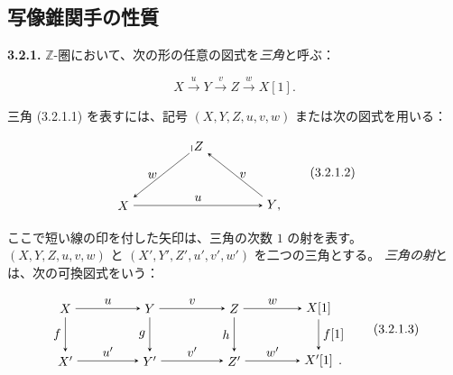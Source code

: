 \clearpage
{}%
\subsection{写像錐関手の性質}

\noindent\textbf{3.2.1.}\quad
{}
$\mathbb Z$-圏において、次の形の任意の図式を\emph{三角}と呼ぶ：

\begin{equation}
  X\xrightarrow{u}Y\xrightarrow{v}Z\xrightarrow{w}X[1].
  \tag{3.2.1.1}
\end{equation}

三角 (3.2.1.1) を表すには、記号 $(X,Y,Z,u,v,w)$ または次の図式を用いる：

\begin{equation}
  \begin{tikzpicture}[>=stealth,baseline=(current bounding box.center)]
    \node (X) at (0,0) {$X$};
    \node (Y) at (4.2,0) {$Y\mathpunct{,}$};
    \node (Z) at (2.1,1.65) {$Z$};
    \draw[->] (X) -- node[above] {$u$} (Y);
    \draw[->] (Y) -- node[right] {$v$} (Z);
    \draw[->] (Z) -- node[left] {$w$} (X);
    \draw[line width=0.45pt] (1.91,1.50) -- (1.91,1.67);
  \end{tikzpicture}
  \tag{3.2.1.2}
\end{equation}

ここで短い線の印を付した矢印は、三角の次数 $1$ の射を表す。
$(X,Y,Z,u,v,w)$ と $(X',Y',Z',u',v',w')$ を二つの三角とする。
\emph{三角の射}とは、次の可換図式をいう：

\begin{equation}
  \begin{tikzpicture}[>=stealth,baseline=(current bounding box.center)]
    \node (X)  at (0,1.45) {$X$};
    \node (Y)  at (2.35,1.45) {$Y$};
    \node (Z)  at (4.70,1.45) {$Z$};
    \node (Xs) at (7.05,1.45) {$X[1]$};
    \node (Xp) at (0,0) {$X'$};
    \node (Yp) at (2.35,0) {$Y'$};
    \node (Zp) at (4.70,0) {$Z'$};
    \node (Xps) at (7.05,0) {$X'[1]$};
    \node[anchor=base west,inner sep=0pt,xshift=.08em] at (Xps.base east) {$.$};
    \draw[->] (X) -- node[above] {$u$} (Y);
    \draw[->] (Y) -- node[above] {$v$} (Z);
    \draw[->] (Z) -- node[above] {$w$} (Xs);
    \draw[->] (Xp) -- node[above] {$u'$} (Yp);
    \draw[->] (Yp) -- node[above] {$v'$} (Zp);
    \draw[->] (Zp) -- node[above] {$w'$} (Xps);
    \draw[->] (X) -- node[left] {$f$} (Xp);
    \draw[->] (Y) -- node[left] {$g$} (Yp);
    \draw[->] (Z) -- node[left] {$h$} (Zp);
    \draw[->] (Xs) -- node[right] {$f[1]$} (Xps);
  \end{tikzpicture}
  \tag{3.2.1.3}
\end{equation}

